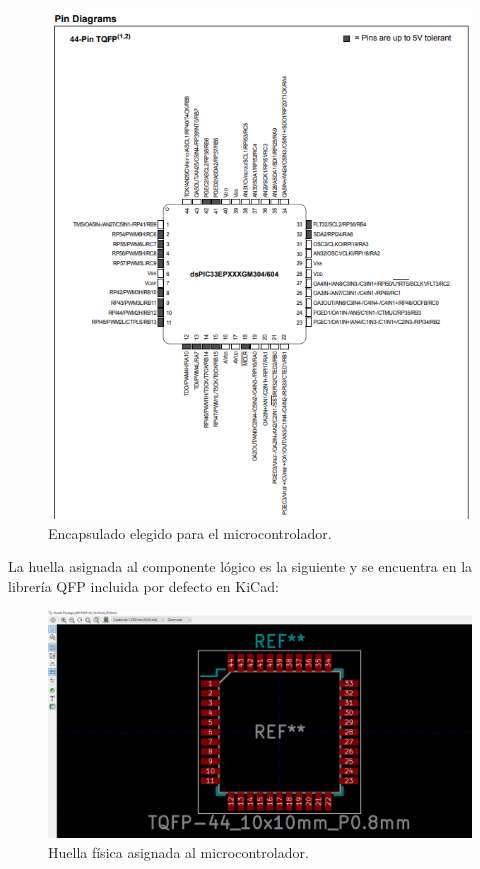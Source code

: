 \begin{figure}[H]
\centering 
\includegraphics[width=0.9\linewidth]{pictures/TQFP.PNG}
\caption{Encapsulado elegido para el microcontrolador.}
\label{fig:CAMBIAR!!!!!!!!!!}
\end{figure}

La huella asignada al componente lógico es la siguiente y se encuentra en la librería QFP incluida por defecto en KiCad:

\begin{figure}[H]
\centering 
\includegraphics[width=0.9\linewidth]{pictures/HuellaPic.PNG}
\caption{Huella física asignada al microcontrolador.}
\label{fig:CAMBIAR!!!!!!!!!!}
\end{figure}

